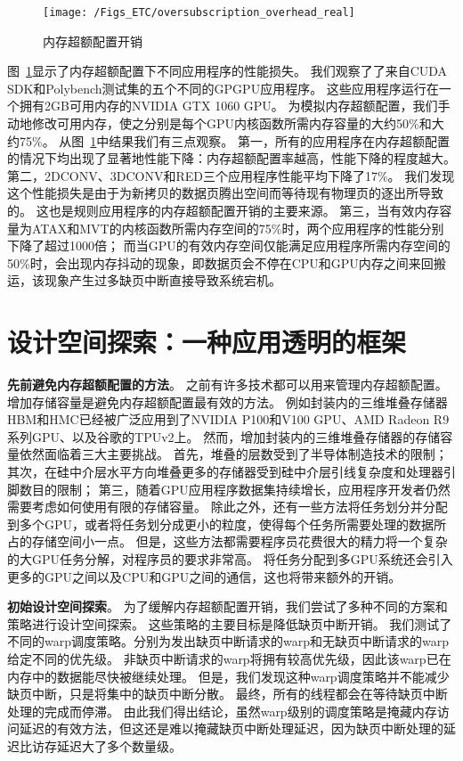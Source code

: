 \begin{figure}[htbp] %
  \centering
  \texttt{[image: /Figs\_ETC/oversubscription\_overhead\_real]}
  \caption{内存超额配置开销}
  \label{fig:oversubscription}
\end{figure}


图~\ref{fig:oversubscription}显示了内存超额配置下不同应用程序的性能损失。
我们观察了了来自CUDA SDK和Polybench测试集的五个不同的GPGPU应用程序。
这些应用程序运行在一个拥有2GB可用内存的NVIDIA GTX 1060 GPU。
为模拟内存超额配置，我们手动地修改可用内存，使之分别是每个GPU内核函数所需内存容量的大约50\%和大约75\%。
从图~\ref{fig:oversubscription}中结果我们有三点观察。
第一，所有的应用程序在内存超额配置的情况下均出现了显著地性能下降：内存超额配置率越高，性能下降的程度越大。
第二，2DCONV、3DCONV和RED三个应用程序性能平均下降了17\%。
我们发现这个性能损失是由于为新拷贝的数据页腾出空间而等待现有物理页的逐出所导致的。
这也是规则应用程序的内存超额配置开销的主要来源。
第三，当有效内存容量为ATAX和MVT的内核函数所需内存空间的75\%时，两个应用程序的性能分别下降了超过1000倍；
而当GPU的有效内存空间仅能满足应用程序所需内存空间的50\%时，会出现内存抖动的现象，即数据页会不停在CPU和GPU内存之间来回搬运，该现象产生过多缺页中断直接导致系统宕机。


\section{设计空间探索：一种应用透明的框架}

\textbf{先前避免内存超额配置的方法}。
之前有许多技术都可以用来管理内存超额配置。
增加存储容量是避免内存超额配置最有效的方法。
例如封装内的三维堆叠存储器HBM和HMC已经被广泛应用到了NVIDIA P100和V100 GPU、AMD Radeon R9系列GPU、以及谷歌的TPUv2上。
然而，增加封装内的三维堆叠存储器的存储容量依然面临着三大主要挑战。
首先，堆叠的层数受到了半导体制造技术的限制；
其次，在硅中介层水平方向堆叠更多的存储器受到硅中介层引线复杂度和处理器引脚数目的限制；
第三，随着GPU应用程序数据集持续增长，应用程序开发者仍然需要考虑如何使用有限的存储容量。
除此之外，还有一些方法将任务划分并分配到多个GPU，或者将任务划分成更小的粒度，使得每个任务所需要处理的数据所占的存储空间小一点。
但是，这些方法都需要程序员花费很大的精力将一个复杂的大GPU任务分解，对程序员的要求非常高。
将任务分配到多GPU系统还会引入更多的GPU之间以及CPU和GPU之间的通信，这也将带来额外的开销。

\textbf{初始设计空间探索}。
为了缓解内存超额配置开销，我们尝试了多种不同的方案和策略进行设计空间探索。
这些策略的主要目标是降低缺页中断开销。
我们测试了不同的warp调度策略。分别为发出缺页中断请求的warp和无缺页中断请求的warp给定不同的优先级。
非缺页中断请求的warp将拥有较高优先级，因此该warp已在内存中的数据能尽快被继续处理。
但是，我们发现这种warp调度策略并不能减少缺页中断，只是将集中的缺页中断分散。
最终，所有的线程都会在等待缺页中断处理的完成而停滞。
由此我们得出结论，虽然warp级别的调度策略是掩藏内存访问延迟的有效方法，但这还是难以掩藏缺页中断处理延迟，因为缺页中断处理的延迟比访存延迟大了多个数量级。

